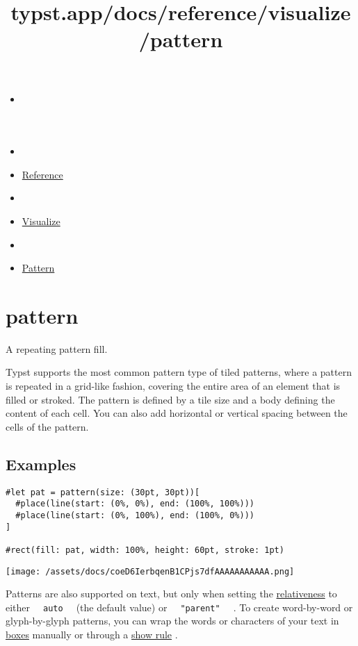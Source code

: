 \title{typst.app/docs/reference/visualize/pattern}

\begin{itemize}
\tightlist
\item
  \href{/docs}{}
\item
  
\item
  \href{/docs/reference/}{Reference}
\item
  
\item
  \href{/docs/reference/visualize/}{Visualize}
\item
  
\item
  \href{/docs/reference/visualize/pattern/}{Pattern}
\end{itemize}

\section{\texorpdfstring{{ pattern }}{ pattern }}\label{summary}

A repeating pattern fill.

Typst supports the most common pattern type of tiled patterns, where a
pattern is repeated in a grid-like fashion, covering the entire area of
an element that is filled or stroked. The pattern is defined by a tile
size and a body defining the content of each cell. You can also add
horizontal or vertical spacing between the cells of the pattern.

\subsection{Examples}\label{examples}

\begin{verbatim}
#let pat = pattern(size: (30pt, 30pt))[
  #place(line(start: (0%, 0%), end: (100%, 100%)))
  #place(line(start: (0%, 100%), end: (100%, 0%)))
]

#rect(fill: pat, width: 100%, height: 60pt, stroke: 1pt)
\end{verbatim}

\texttt{[image: /assets/docs/coeD6IerbqenB1CPjs7dfAAAAAAAAAAA.png]}

Patterns are also supported on text, but only when setting the
\href{/docs/reference/visualize/pattern/\#parameters-relative}{relativeness}
to either \texttt{\ }{\texttt{\ auto\ }}\texttt{\ } (the default value)
or \texttt{\ }{\texttt{\ "parent"\ }}\texttt{\ } . To create
word-by-word or glyph-by-glyph patterns, you can wrap the words or
characters of your text in \href{/docs/reference/layout/box/}{boxes}
manually or through a \href{/docs/reference/styling/\#show-rules}{show
rule} .

